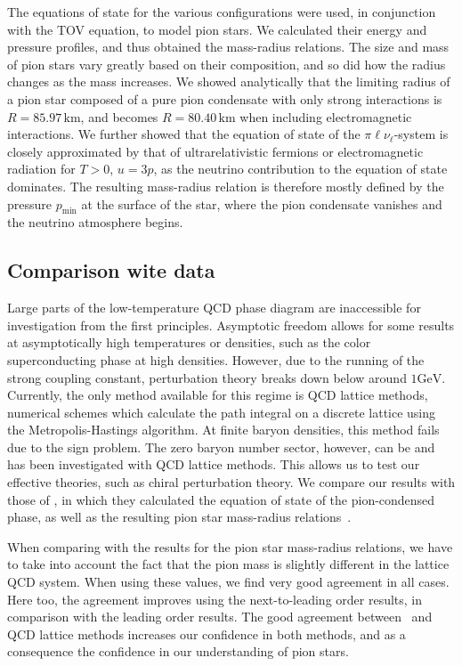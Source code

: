 The equations of state for the various configurations were used, in conjunction with the TOV equation, to model pion stars.
We calculated their energy and pressure profiles, and thus obtained the mass-radius relations.
The size and mass of pion stars vary greatly based on their composition, and so did how the radius changes as the mass increases.
We showed analytically that the limiting radius of a pion star composed of a pure pion condensate with only strong interactions is $R = 85.97\,\text{km}$, and becomes $R = 80.40\,\text{km}$ when including electromagnetic interactions.
We further showed that the equation of state of the $\pi\ell\nu_\ell$-system is closely approximated by that of ultrarelativistic fermions or electromagnetic radiation for $T>0$, $u = 3p$, as the neutrino contribution to the equation of state dominates.
The resulting mass-radius relation is therefore mostly defined by the pressure $p_\text{min}$ at the surface of the star, where the pion condensate vanishes and the neutrino atmosphere begins.


\subsection{Comparison wite data}

Large parts of the low-temperature QCD phase diagram are inaccessible for investigation from the first principles.
Asymptotic freedom allows for some results at asymptotically high temperatures or densities, such as the color superconducting phase at high densities.
However, due to the running of the strong coupling constant, perturbation theory breaks down below around $1 \text{GeV}$.
Currently, the only method available for this regime is QCD lattice methods, numerical schemes which calculate the path integral on a discrete lattice using the Metropolis-Hastings algorithm.
At finite baryon densities, this method fails due to the sign problem.
The zero baryon number sector, however, can be and has been investigated with QCD lattice methods.
This allows us to test our effective theories, such as chiral perturbation theory.
We compare our results with those of \citeauthor{brandtNewClassCompact2018}, in which they calculated the equation of state of the pion-condensed phase, as well as the resulting pion star mass-radius relations~\autocite{brandtNewClassCompact2018}.

When comparing with the results for the pion star mass-radius relations, we have to take into account the fact that the pion mass is slightly different in the lattice QCD system.
When using these values, we find very good agreement in all cases.
Here too, the agreement improves using the next-to-leading order results, in comparison with the leading order results.
The good agreement between \chpt\, and QCD lattice methods increases our confidence in both methods, and as a consequence the confidence in our understanding of pion stars.



